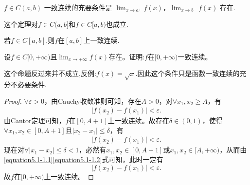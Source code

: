 \documentclass[lang=cn,newtx,10pt,scheme=chinese]{elegantbook}
\begin{document}
\begin{theorem}[Cantor定理]\label{theorem:Cantor定理}
\(f\in C(a,b)\) 一致连续的充要条件是 \(\lim_{x\rightarrow a^{+}}f(x)\)，\(\lim_{x\rightarrow b^{-}}f(x)\) 存在.
\end{theorem}
\begin{remark}
这个定理对$f\in C(a,b]$和$f\in C[a,b)$也成立.
\end{remark}

\begin{corollary}\label{corollary:闭区间上的连续函数一定一致连续.}
若$f\in C[a,b]$,则$f$在$[a,b]$上一致连续.
\end{corollary}

\begin{proposition}\label{proposition一致连续的充分不必要条件}
设\(f\in C[0,+\infty)\)且\(\lim_{x\rightarrow +\infty}f(x)\)存在。证明:\(f\)在\([0,+\infty)\)一致连续。
\end{proposition}
\begin{remark}
这个命题反过来并不成立,反例:$f(x)=\sqrt{x}$.因此这个条件只是函数一致连续的充分不必要条件.
\end{remark}
\begin{proof}
\(\forall \varepsilon > 0\)，由Cauchy收敛准则可知，存在\(A > 0\)，对\(\forall x_1, x_2 \geqslant A\)，有
\begin{align}
\left| f(x_2) - f(x_1) \right| < \varepsilon.  \label{equation5.1-1.1}
\end{align}
由Cantor定理可知，\(f\)在\([0, A + 1]\)上一致连续。故存在\(\delta \in (0, 1)\)，使得\(\forall x_1, x_2 \in [0, A + 1]\)且\(\left| x_2 - x_1 \right| \leqslant \delta\)，有
\begin{align}
\left| f(x_2) - f(x_1) \right| < \varepsilon.\label{equation5.1-1.2}
\end{align}
现在对\(\forall \left| x_1 - x_2 \right| \leqslant \delta < 1\)，必然有\(x_1, x_2 \in [0, A + 1]\)或\(x_1, x_2 \in [A, +\infty)\)，从而由\eqref{equation5.1-1.1}\eqref{equation5.1-1.2}式可知，此时一定有
\[
\left| f(x_2) - f(x_1) \right| < \varepsilon.
\]
故\(f\)在\([0, +\infty)\)上一致连续。
\end{proof}
\end{document}

